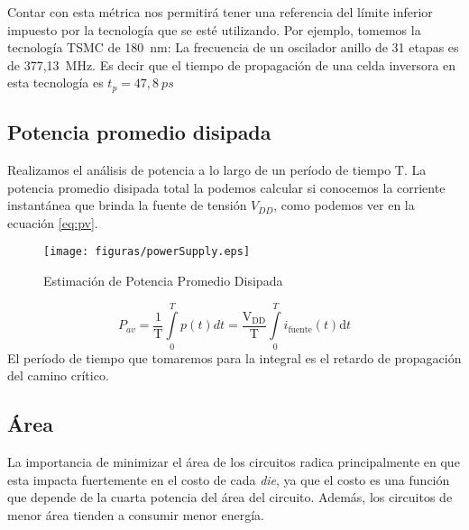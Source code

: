 Contar con esta métrica nos permitirá tener una referencia del límite inferior impuesto por la tecnología que se esté utilizando. Por ejemplo, tomemos la tecnología TSMC de 180~nm: La frecuencia de un oscilador anillo de 31 etapas es de 377,13~MHz. Es decir que el tiempo de propagación de una celda inversora en esta tecnología es $t_p = 47,8~ps$












\subsection{Potencia promedio disipada}
Realizamos el análisis de potencia a lo largo de un período de tiempo $\mathrm{T}$. La potencia promedio disipada total la podemos calcular si conocemos la corriente instantánea que brinda la fuente de tensión $V_{DD}$, como podemos ver en la ecuación \ref{eq:pv}.
\begin{figure}[h]
\centering
\texttt{[image: figuras/powerSupply.eps]}
  \caption{Estimación de Potencia Promedio Disipada }
  \label{fig:powerSupply}
\end{figure}

\begin{equation}
P_{av} = \frac{1}{\mathrm{T}}\int\limits_0^T p(t)dt = \mathrm{\frac{V_{DD}}{T}}\int\limits_0^T i_{\mathrm{fuente}}(t)\mathrm{d}t 
\label{eq:pv}
\end{equation}
El período de tiempo que tomaremos para la integral es el retardo de propagación del camino crítico.

\subsection{Área}
La importancia de minimizar el área de los circuitos radica principalmente en que esta impacta fuertemente en el costo de cada \emph{die}\cite{HennessyPatterson}, ya que el costo es una función que depende de la cuarta potencia del área del circuito\cite{rabaey2003}. Además, los circuitos de menor área tienden a consumir menor energía. 



